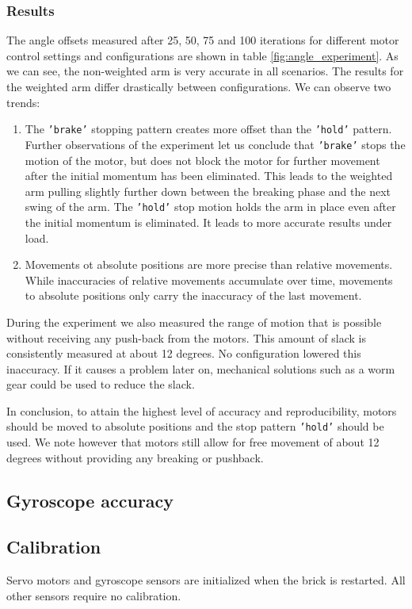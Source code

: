 \documentclass[11pt, a4paper]{article}
\begin{document}
\subsubsection*{Results}
The angle offsets measured after 25, 50, 75 and 100 iterations for different motor control settings and configurations are shown in table \ref{fig:angle_experiment}. As we can see, the non-weighted arm is very accurate in all scenarios. The results for the weighted arm differ drastically between configurations. We can observe two trends:
\begin{enumerate}
	\item The \texttt{'brake'} stopping pattern creates more offset than the \texttt{'hold'} pattern. Further observations of the experiment let us conclude that \texttt{'brake'} stops the motion of the motor, but does not block the motor for further movement after the initial momentum has been eliminated. This leads to the weighted arm pulling slightly further down between the breaking phase and the next swing of the arm. The \texttt{'hold'} stop motion holds the arm in place even after the initial momentum is eliminated. It leads to more accurate results under load.
	\item Movements ot absolute positions are more precise than relative movements. While inaccuracies of relative movements accumulate over time, movements to absolute positions only carry the inaccuracy of the last movement.
\end{enumerate}
During the experiment we also measured the range of motion that is possible without receiving any push-back from the motors. This amount of slack is consistently measured at about 12 degrees. No configuration lowered this inaccuracy. If it causes a problem later on, mechanical solutions such as a worm gear could be used to reduce the slack.

\bigskip
In conclusion, to attain the highest level of accuracy and reproducibility, motors should be moved to absolute positions and the stop pattern \texttt{'hold'} should be used. We note however that motors still allow for free movement of about 12 degrees without providing any breaking or pushback.




\subsection{Gyroscope accuracy}

\subsection{Calibration} \label{calibration}
Servo motors and gyroscope sensors are initialized when the brick is restarted. All other sensors require no calibration.
\end{document}
